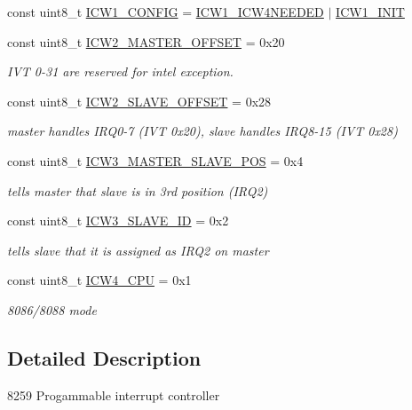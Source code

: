\begin{DoxyCompactItemize}
const uint8\+\_\+t \hyperlink{namespace_p_i_c_aa3b99beaed95a8a51f1e855723e05d48}{I\+C\+W1\+\_\+\+C\+O\+N\+F\+IG} = \hyperlink{namespace_p_i_c_a63beb0c60fdab8c997f42291a7c2baf5}{I\+C\+W1\+\_\+\+I\+C\+W4\+N\+E\+E\+D\+ED} $\vert$ \hyperlink{namespace_p_i_c_a8bb2fc0a772eabbbf6adb002f578290e}{I\+C\+W1\+\_\+\+I\+N\+IT}
\item 
const uint8\+\_\+t \hyperlink{namespace_p_i_c_a4eada3349fe4b6740074b1adecdb080b}{I\+C\+W2\+\_\+\+M\+A\+S\+T\+E\+R\+\_\+\+O\+F\+F\+S\+ET} = 0x20
\begin{DoxyCompactList}\small\item\em I\+VT 0-\/31 are reserved for intel exception. \end{DoxyCompactList}\item 
const uint8\+\_\+t \hyperlink{namespace_p_i_c_a33b48f750baf61bf1820e5b36ce44a48}{I\+C\+W2\+\_\+\+S\+L\+A\+V\+E\+\_\+\+O\+F\+F\+S\+ET} = 0x28
\begin{DoxyCompactList}\small\item\em master handles I\+R\+Q0-\/7 (I\+VT 0x20), slave handles I\+R\+Q8-\/15 (I\+VT 0x28) \end{DoxyCompactList}\item 
const uint8\+\_\+t \hyperlink{namespace_p_i_c_ade78b65e9f0859d0d5ca14df7148b305}{I\+C\+W3\+\_\+\+M\+A\+S\+T\+E\+R\+\_\+\+S\+L\+A\+V\+E\+\_\+\+P\+OS} = 0x4
\begin{DoxyCompactList}\small\item\em tells master that slave is in 3rd position (I\+R\+Q2) \end{DoxyCompactList}\item 
const uint8\+\_\+t \hyperlink{namespace_p_i_c_abe9c403a4caa1dd885595bd27c803122}{I\+C\+W3\+\_\+\+S\+L\+A\+V\+E\+\_\+\+ID} = 0x2
\begin{DoxyCompactList}\small\item\em tells slave that it is assigned as I\+R\+Q2 on master \end{DoxyCompactList}\item 
const uint8\+\_\+t \hyperlink{namespace_p_i_c_a3d092deea6581b86dddc5fb5c7fde403}{I\+C\+W4\+\_\+\+C\+PU} = 0x1
\begin{DoxyCompactList}\small\item\em 8086/8088 mode \end{DoxyCompactList}\end{DoxyCompactItemize}


\subsection{Detailed Description}
8259 Progammable interrupt controller 

